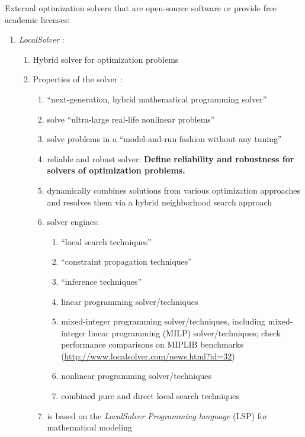 External optimization solvers that are open-source software or provide free academic licenses: \vspace{-0.3cm}
\begin{enumerate} \itemsep -4pt
\item {\it LocalSolver} \cite{Innovation24Staff2015}: \vspace{-0.3cm}
	\begin{enumerate} \itemsep -2pt
	\item Hybrid solver for optimization problems
	\item Properties of the solver \cite[Product: Overview]{Innovation24Staff2015}: \vspace{-0.2cm}
		\begin{enumerate} \itemsep -2pt
		\item ``next-generation, hybrid mathematical programming solver''
		\item solve ``ultra-large real-life nonlinear problems''
		\item solve problems in a ``model-and-run fashion without any tuning''
		\item reliable and robust solver: {\bf Define reliability and robustness for solvers of optimization problems.}
		\item dynamically combines solutions from various optimization approaches and resolves them via a hybrid neighborhood search approach
		\item solver engines: \vspace{-0.1cm}
			\begin{enumerate} \itemsep -1pt
			\item ``local search techniques''
			\item ``constraint propagation techniques''
			\item ``inference techniques''
			\item linear programming solver/techniques
			\item mixed-integer programming solver/techniques, including mixed-integer linear programming (MILP) solver/techniques; check performance comparisons on {MIPLIB} benchmarks (\url{http://www.localsolver.com/news.html?id=32})
			\item nonlinear programming solver/techniques
			\item combined pure and direct local search techniques
			\end{enumerate}
		\item is based on the {\it LocalSolver Programming language} (LSP) for mathematical modeling

\end{enumerate}
\end{enumerate}
\end{enumerate}

